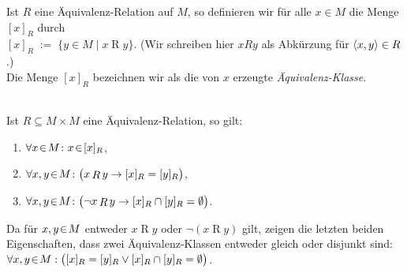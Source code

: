 \begin{Definition}
Ist $R$ eine \"{A}quivalenz-Relation auf $M$, so definieren wir f\"{u}r alle $x \in M$ 
die Menge $[x]_R$ durch \\[0.2cm]
\hspace*{1.3cm} $[x]_R \;:=\; \bigl\{ y \in M \mid x \mathop{R} y \bigr\}$. \qquad
(Wir schreiben hier $x R y$ als Abk\"{u}rzung f\"{u}r $\pair(x, y) \in R$.) 
\\[0.2cm]
Die Menge $[x]_R$ bezeichnen wir als die von $x$ erzeugte \emph{\"{A}quivalenz-Klasse}.  \eox
\end{Definition}

\begin{Satz} \label{satz:aequivalenz-klassen}
\hspace*{\fill} \\
Ist $R \subseteq M \times M$ eine \"{A}quivalenz-Relation, so gilt: 
\begin{enumerate}
\item $\forall x \!\in\! M \colon x \!\in\! [x]_R$,
\item $\forall x, y \!\in\! M \colon \bigl(x \mathop{R} y \rightarrow [x]_R = [y]_R\bigr)$,
\item $\forall x, y \!\in\! M \colon \bigl(\neg x \mathop{R} y \rightarrow [x]_R \cap [y]_R = \emptyset\bigr)$.
\end{enumerate}
\end{Satz}


\remark
Da f\"{u}r $x,y\!\in\! M$ entweder $x \mathop{R} y$ oder $\neg (x \mathop{R} y)$ gilt, zeigen die
letzten beiden Eigenschaften, dass zwei \"{A}quivalenz-Klassen entweder gleich
oder disjunkt sind:
\\[0.2cm]
\hspace*{1.3cm}
$\forall x, y \!\in\! M: \bigl([x]_R = [y]_R \vee [x]_R \cap [y]_R = \emptyset\bigr)$. \eox

